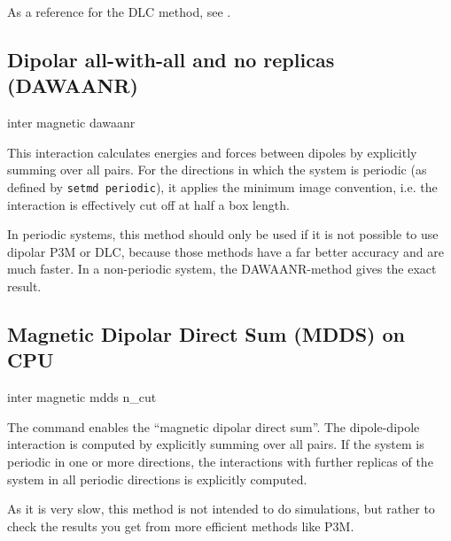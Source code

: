 As a reference for the DLC method, see \cite{brodka04a}.

\subsection{Dipolar all-with-all and no replicas (DAWAANR)}

\begin{essyntax}
  inter magnetic  dawaanr
  \begin{features}
  \end{features}
\end{essyntax}

This interaction calculates energies and forces between dipoles by
explicitly summing over all pairs.  For the directions in which the
system is periodic (as defined by \texttt{setmd periodic}), it applies
the minimum image convention, i.e. the interaction is effectively cut
off at half a box length.

In periodic systems, this method should only be used if it is not possible to use dipolar P3M or
DLC, because those methods have a far better accuracy and are much faster.
In a non-periodic system, the DAWAANR-method gives the exact result.

\subsection{Magnetic Dipolar Direct Sum (MDDS) on CPU}

\begin{essyntax}
  inter magnetic  mdds n\_cut 
  \begin{features}
  \end{features}
\end{essyntax}

The command enables the ``magnetic dipolar direct sum''.  The
dipole-dipole interaction is computed by explicitly summing over all
pairs. If the system is periodic in one or more directions, the
interactions with further  replicas of the system
in all periodic directions is explicitly computed.

As it is very slow, this method is not intended to do simulations,
but rather to check the results you get from more efficient methods
like P3M.


